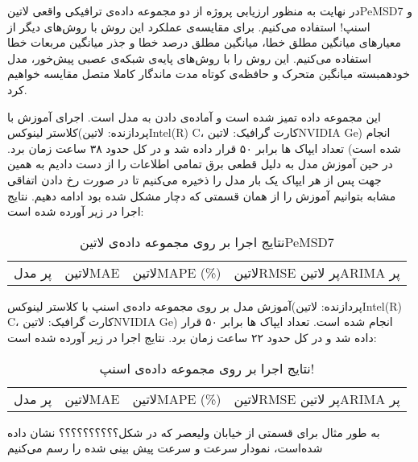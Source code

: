 
در نهایت به منظور ارزیابی پروژه از دو مجموعه داده‌ی ترافیکی واقعی ‌لاتین{PeMSD7} و اسنپ! استفاده می‌کنیم.
برای مقایسه‌ی عملکرد این روش با روش‌های دیگر از معیارهای میانگین مطلق خطا، میانگین مطلق درصد خطا و جذر میانگین مربعات خطا استفاده می‌کنیم.
این روش را با روش‌های پایه‌ی شبکه‌ی عصبی پیش‌خور، مدل خودهمبسته میانگین متحرک و حافظه‌ی کوتاه مدت ماندگار کاملا متصل  مقایسه خواهیم کرد.


این مجموعه داده تمیز شده است و آماده‌ی دادن به مدل است. اجرای آموزش با کلاستر لینوکس(پردازنده: ‌لاتین{Intel(R) C}، کارت گرافیک: ‌لاتین{NVIDIA Ge}) انجام شده است)
تعداد ایپاک ها برابر ۵۰ قرار داده شد و در کل حدود ۳۸ ساعت زمان برد.
در حین آموزش مدل به دلیل قطعی برق تمامی اطلاعات را از دست دادیم به همین جهت پس از هر ایپاک یک بار مدل را ذخیره می‌کنیم تا در صورت رخ دادن اتفاقی مشابه بتوانیم آموزش را از همان قسمتی که دچار مشکل شده بود ادامه دهیم. نتایج اجرا در زیر آورده شده است:

\begin{table}[h]
  \centering
  \caption{نتایج اجرا بر روی مجموعه داده‌ی ‌لاتین{PeMSD7}}
  \begin{tabular}{|c|c|c|c|}
    ‌پر
    مدل & ‌لاتین{MAE} & ‌لاتین{MAPE (\%)} & ‌لاتین{RMSE}
    ‌پر
    ‌لاتین{ARIMA}
    ‌پر
  \end{tabular}
\end{table}


آموزش مدل بر روی مجموعه داده‌ی اسنپ با کلاستر لینوکس(پردازنده: ‌لاتین{Intel(R) C}، کارت گرافیک: ‌لاتین{NVIDIA Ge}) انجام شده است. تعداد ایپاک ها برابر ۵۰ قرار داده شد و در کل حدود ۲۲ ساعت زمان برد. نتایج اجرا در زیر آورده شده است:

\begin{table}[h]
  \centering
  \caption{نتایج اجرا بر روی مجموعه داده‌ی اسنپ!}
  \begin{tabular}{|c|c|c|c|}
    ‌پر
    مدل & ‌لاتین{MAE} & ‌لاتین{MAPE (\%)} & ‌لاتین{RMSE}
    ‌پر
    ‌لاتین{ARIMA}
    ‌پر
  \end{tabular}
\end{table}

به طور مثال برای قسمتی از خیابان ولیعصر که در شکل؟؟؟؟؟؟؟؟؟؟ نشان داده شده‌است، نمودار سرعت و سرعت پیش بینی شده را رسم می‌کنیم

